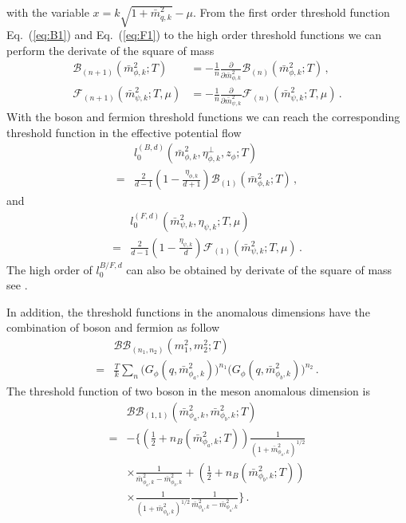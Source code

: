 \documentclass[%
reprint,
superscriptaddress,
showpacs,preprintnumbers,
 amsmath,amssymb,
 aps,
prd,
]{revtex4-1}
\def\Eq#1{Eq.~(\ref{#1})}
\begin{document}
with the variable $x=k\sqrt{1+\bar{m}^{2}_{q,k}}-\mu$. From the first order threshold function \Eq{eq:B1} and \Eq{eq:F1} to the high order threshold functions we can perform the derivate of the square of mass
\begin{align}
  \mathcal{B}_{(n+1)}(\bar{m}^{2}_{\phi,k};T)&=-\frac{1}{n}\frac{\partial}{\partial \bar{m}^{2}_{\phi,k}}\mathcal{B}_{(n)}(\bar{m}^{2}_{\phi,k};T)\,,\\[2ex]
  \mathcal{F}_{(n+1)}(\bar{m}^{2}_{\psi,k};T,\mu)&=-\frac{1}{n}\frac{\partial}{\partial \bar{m}^{2}_{\psi,k}}
                                    \mathcal{F}_{(n)}(\bar{m}^{2}_{\psi,k};T,\mu)\,. 
\end{align}
With the boson and fermion threshold functions we can reach the corresponding threshold function in the effective potential flow
\begin{align}
  &l_0^{(B,d)}(\bar{m}^{2}_{\phi,k},\eta^\perp_{\phi,k},z_\phi;T)\nonumber\\[2ex]
  =&\frac{2}{d-1}\left( 1- \frac{\eta_{\phi,k}}{d+1}\right)\mathcal{B}_{(1)}(\bar{m}^{2}_{\phi,k};T)\,,\label{eq:l0B}
\end{align} 
and
\begin{align}
  &l_0^{(F,d)}(\bar{m}^{2}_{\psi,k},\eta_{\psi,k};T,\mu)\nonumber\\[2ex]
  =&\frac{2}{d-1}\left( 1-\frac{\eta_{\psi,k}}{d} \right)\mathcal{F}_{(1)}(\bar{m}^{2}_{\psi,k};T,\mu)\,.\label{eq:l0F}
\end{align} 
The high order of $l^{B/F,d}_0$ can also be obtained by derivate of the square of mass see \cite{Yin:2019ebz}. \par
In addition, the threshold functions in the anomalous dimensions have the combination of boson and fermion as follow
\begin{align}
  &\mathcal{BB}_{(n_1,n_2)}(m_1^2,m_2^2;T)\nonumber\\[2ex]
=&\frac{T}{k}\sum_{n}\Big(G_\phi(q,\bar{m}^{2}_{\phi_a,k})\Big)^{n_1} \Big(G_\phi(q,\bar{m}^{2}_{\phi_b,k})\Big)^{n_2}\,.\label{eq:BBn1n2}
\end{align}
The threshold function of two boson in the meson anomalous dimension is
\begin{align}
  &\mathcal{BB}_{(1,1)}(\bar{m}^{2}_{\phi_a,k},\bar{m}^{2}_{\phi_b,k};T)\nonumber\\[2ex]
  =&-\Bigg\{\left(\frac{1}{2}+n_B(\bar{m}^{2}_{\phi_a,k};T) \right)\frac{1}{(1+\bar{m}^{2}_{\phi_a,k})^{1/2}} \nonumber\\[2ex]
&\times \frac{1}{\bar{m}^{2}_{\phi_a,k}-\bar{m}^{2}_{\phi_b,k}}+\left( \frac{1}{2}+n_B(\bar{m}^{2}_{\phi_b,k};T) 
\right)\nonumber\\[2ex]
&\times \frac{1}{(1+\bar{m}^{2}_{\phi_b,k})^{1/2}}\frac{1}{\bar{m}^{2}_{\phi_b,k}-\bar{m}^{2}_{\phi_a,k}}\Bigg\}\,.\label{eq:BB11}
\end{align} 
\end{document}
